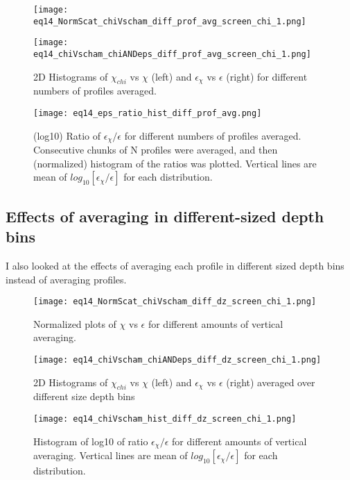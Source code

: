 \documentclass[11pt]{article}
\begin{document}
\begin{figure}[htbp]
\texttt{[image: eq14\_NormScat\_chiVscham\_diff\_prof\_avg\_screen\_chi\_1.png]}
\caption{}
\label{}
\end{figure}

\begin{figure}[htbp]
\texttt{[image: eq14\_chiVscham\_chiANDeps\_diff\_prof\_avg\_screen\_chi\_1.png]}
\caption{2D Histograms of $\chi_{chi}$ vs $\chi$ (left) and $\epsilon_{\chi}$ vs $\epsilon$ (right) for different numbers of profiles averaged.}
\label{}
\end{figure}


\begin{figure}[htbp]
\texttt{[image: eq14\_eps\_ratio\_hist\_diff\_prof\_avg.png]}
\caption{(log10) Ratio of $\epsilon_{\chi}/\epsilon$ for different numbers of profiles averaged. Consecutive chunks of N profiles were averaged, and then (normalized) histogram of the ratios was plotted. Vertical lines are mean of $log_{10}[\epsilon_{\chi}/\epsilon]$ for each distribution. }
\label{}
\end{figure}




\clearpage
\subsection{Effects of averaging in different-sized depth bins}

I also looked at the effects of averaging each profile in different sized depth bins instead of averaging profiles.

\begin{figure}[htbp]
\texttt{[image: eq14\_NormScat\_chiVscham\_diff\_dz\_screen\_chi\_1.png]}
\caption{Normalized plots of $\chi$ vs $\epsilon$ for different amounts of vertical averaging.}
\label{}
\end{figure}

\begin{figure}[htbp]
\texttt{[image: eq14\_chiVscham\_chiANDeps\_diff\_dz\_screen\_chi\_1.png]}
\caption{2D Histograms of $\chi_{chi}$ vs $\chi$ (left) and $\epsilon_{\chi}$ vs $\epsilon$ (right) averaged over different size depth bins}
\label{}
\end{figure}



\begin{figure}[htbp]
\texttt{[image: eq14\_chiVscham\_hist\_diff\_dz\_screen\_chi\_1.png]}
\caption{Histogram of log10 of ratio $\epsilon_{\chi}/\epsilon$ for different amounts of vertical averaging. Vertical lines are mean of $log_{10}[\epsilon_{\chi}/\epsilon]$ for each distribution.}
\label{}
\end{figure}
\end{document}
